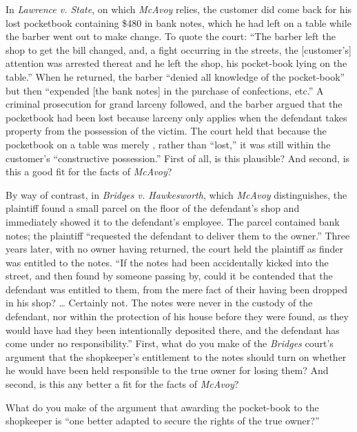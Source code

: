 
\item In \textit{Lawrence v. State}, on which \textit{McAvoy} relies, the
customer did come back for his lost pocketbook containing \$480 in bank notes,
which he had left on a table while the barber went out to make change. To quote
the court: ``The barber left the shop to get the bill changed, and, a fight
occurring in the streets, the [customer's] attention was arrested thereat and
he left the shop, his pocket-book lying on the table.'' When he returned, the
barber ``denied all knowledge of the pocket-book'' but then ``expended [the
bank notes] in the purchase of confections, etc.'' A criminal prosecution for
grand larceny followed, and the barber argued that the pocketbook had been lost
because larceny only applies when the defendant takes property from the
possession of the victim. The court held that because the pocketbook on a table
was merely , rather than ``lost,'' it was still within the
customer's ``constructive possession.'' First of all, is this plausible? And
second, is this a good fit for the facts of \textit{McAvoy}?


\item By way of contrast, in \textit{Bridges v. Hawkesworth}, which
\textit{McAvoy} distinguishes, the plaintiff found a small parcel on the floor
of the defendant's shop and immediately showed it to the defendant's employee.
The parcel contained bank notes; the plaintiff ``requested the defendant to
deliver them to the owner.'' Three years later, with no owner having returned,
the court held the plaintiff as finder was entitled to the notes. ``If the
notes had been accidentally kicked into the street, and then found by someone
passing by, could it be contended that the defendant was entitled to them, from
the mere fact of their having been dropped in his shop? \dots{} Certainly not.
The notes were never in the custody of the defendant, nor within the protection
of his house before they were found, as they would have had they been
intentionally deposited there, and the defendant has come under no
responsibility.'' First, what do you make of the \textit{Bridges} court's
argument that the shopkeeper's entitlement to the notes should turn on whether
he would have been held responsible to the true owner for losing them? And
second, is this any better a fit for the facts of \textit{McAvoy}?


\item What do you make of the argument that awarding the pocket-book to the
shopkeeper is ``one better adapted to secure the rights of the true owner?''


